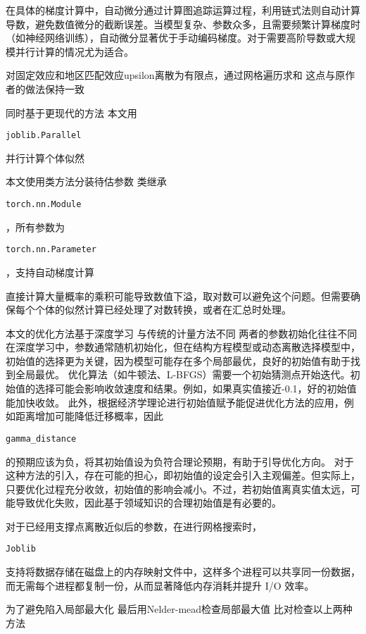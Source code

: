 \documentclass[a4paper,12pt,oneside]{book} %
\begin{document}
在具体的梯度计算中，自动微分通过计算图追踪运算过程，利用链式法则自动计算导数，避免数值微分的截断误差。当模型复杂、参数众多，且需要频繁计算梯度时（如神经网络训练），自动微分显著优于手动编码梯度。对于需要高阶导数或大规模并行计算的情况尤为适合。

对固定效应和地区匹配效应upsilon离散为有限点，通过网格遍历求和
这点与原作者的做法保持一致

同时基于更现代的方法
本文用\begin{verbatim}joblib.Parallel\end{verbatim}并行计算个体似然

本文使用类方法分装待估参数
类继承\begin{verbatim}torch.nn.Module\end{verbatim}，所有参数为\begin{verbatim}torch.nn.Parameter\end{verbatim}，支持自动梯度计算

直接计算大量概率的乘积可能导致数值下溢，取对数可以避免这个问题。但需要确保每个个体的似然计算已经处理了对数转换，或者在汇总时处理。

本文的优化方法基于深度学习
与传统的计量方法不同
两者的参数初始化往往不同
在深度学习中，参数通常随机初始化，但在结构方程模型或动态离散选择模型中，初始值的选择更为关键，因为模型可能存在多个局部最优，良好的初始值有助于找到全局最优。
优化算法（如牛顿法、L-BFGS）需要一个初始猜测点开始迭代。初始值的选择可能会影响收敛速度和结果。例如，如果真实值接近-0.1，好的初始值能加快收敛。
此外，根据经济学理论进行初始值赋予能促进优化方法的应用，例如距离增加可能降低迁移概率，因此\begin{verbatim}gamma_distance\end{verbatim}的预期应该为负，将其初始值设为负符合理论预期，有助于引导优化方向。
对于这种方法的引入，存在可能的担心，即初始值的设定会引入主观偏差。但实际上，只要优化过程充分收敛，初始值的影响会减小。不过，若初始值离真实值太远，可能导致优化失败，因此基于领域知识的合理初始值是有必要的。


对于已经用支撑点离散近似后的参数，在进行网格搜索时，\begin{verbatim}Joblib\end{verbatim}支持将数据存储在磁盘上的内存映射文件中，这样多个进程可以共享同一份数据，而无需每个进程都复制一份，从而显著降低内存消耗并提升 I/O 效率。

为了避免陷入局部最大化
最后用Nelder-mead检查局部最大值
比对检查以上两种方法




\end{document}

